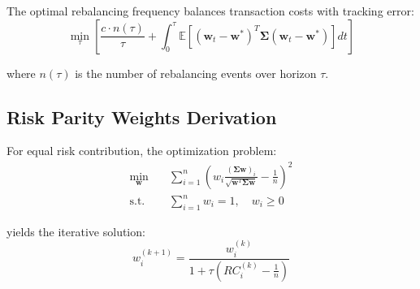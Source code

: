 \documentclass[onecolumn,11pt]{IEEEtran}
\begin{document}
The optimal rebalancing frequency balances transaction costs with tracking error:
\begin{equation}
\min_\tau \left[ \frac{c \cdot n(\tau)}{\tau} + \int_0^\tau \mathbb{E}[(\mathbf{w}_t - \mathbf{w}^*)^T \boldsymbol{\Sigma} (\mathbf{w}_t - \mathbf{w}^*)] dt \right]
\end{equation}

where $n(\tau)$ is the number of rebalancing events over horizon $\tau$.

\subsection{Risk Parity Weights Derivation}

For equal risk contribution, the optimization problem:
\begin{align}
\min_{\mathbf{w}} &\quad \sum_{i=1}^n \left( w_i \frac{(\boldsymbol{\Sigma}\mathbf{w})_i}{\sqrt{\mathbf{w}^T\boldsymbol{\Sigma}\mathbf{w}}} - \frac{1}{n} \right)^2 \\
\text{s.t.} &\quad \sum_{i=1}^n w_i = 1, \quad w_i \geq 0
\end{align}

yields the iterative solution:
\begin{equation}
w_i^{(k+1)} = \frac{w_i^{(k)}}{1 + \tau \left( RC_i^{(k)} - \frac{1}{n} \right)}
\end{equation}
\end{document}
